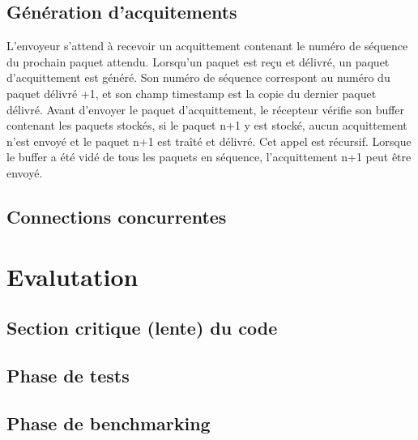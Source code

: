 \documentclass{article}
\begin{document}
\subsection{Génération d'acquitements}
L'envoyeur s'attend à recevoir un acquittement contenant le numéro de séquence du prochain paquet attendu. Lorsqu'un paquet est reçu et délivré, un paquet d'acquittement est généré. Son numéro de séquence correspont au numéro du paquet délivré +1, et son champ timestamp est la copie du dernier paquet délivré.
Avant d'envoyer le paquet d'acquittement, le récepteur vérifie son buffer contenant les paquets stockés, si le paquet n+1 y est stocké, aucun acquittement n'est envoyé et le paquet n+1 est traîté et délivré. Cet appel est récursif. Lorsque le buffer a été vidé de tous les paquets en séquence, l'acquittement n+1 peut être envoyé.
\subsection{Connections concurrentes}

\section{Evalutation}

\subsection{Section critique (lente) du code}
\subsection{Phase de tests}

\subsection{Phase de benchmarking}
\end{document}
